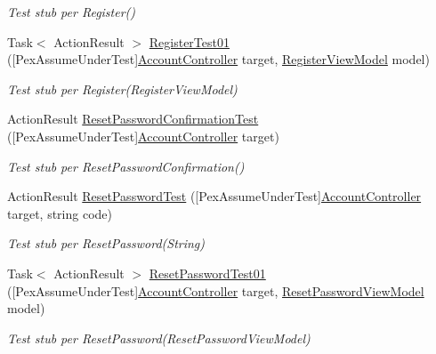 \begin{DoxyCompactItemize}
\begin{DoxyCompactList}\small\item\em Test stub per Register()\end{DoxyCompactList}\item 
Task$<$ Action\+Result $>$ \mbox{\hyperlink{class_brew_day2_1_1_controllers_1_1_testsn_1_1_account_controller_test_a70d7bb44301035e04a265cd34fd7b400}{Register\+Test01}} (\mbox{[}Pex\+Assume\+Under\+Test\mbox{]}\mbox{\hyperlink{class_brew_day2_1_1_controllers_1_1_account_controller}{Account\+Controller}} target, \mbox{\hyperlink{class_brew_day2_1_1_models_1_1_register_view_model}{Register\+View\+Model}} model)
\begin{DoxyCompactList}\small\item\em Test stub per Register(\+Register\+View\+Model)\end{DoxyCompactList}\item 
Action\+Result \mbox{\hyperlink{class_brew_day2_1_1_controllers_1_1_testsn_1_1_account_controller_test_a6ac01fc400a454f7f4038a81fed7ee5c}{Reset\+Password\+Confirmation\+Test}} (\mbox{[}Pex\+Assume\+Under\+Test\mbox{]}\mbox{\hyperlink{class_brew_day2_1_1_controllers_1_1_account_controller}{Account\+Controller}} target)
\begin{DoxyCompactList}\small\item\em Test stub per Reset\+Password\+Confirmation()\end{DoxyCompactList}\item 
Action\+Result \mbox{\hyperlink{class_brew_day2_1_1_controllers_1_1_testsn_1_1_account_controller_test_a40ec01e18af8d68e5dfa9a090d03a954}{Reset\+Password\+Test}} (\mbox{[}Pex\+Assume\+Under\+Test\mbox{]}\mbox{\hyperlink{class_brew_day2_1_1_controllers_1_1_account_controller}{Account\+Controller}} target, string code)
\begin{DoxyCompactList}\small\item\em Test stub per Reset\+Password(\+String)\end{DoxyCompactList}\item 
Task$<$ Action\+Result $>$ \mbox{\hyperlink{class_brew_day2_1_1_controllers_1_1_testsn_1_1_account_controller_test_a79d28e0747aa48923435fe021b74ad7c}{Reset\+Password\+Test01}} (\mbox{[}Pex\+Assume\+Under\+Test\mbox{]}\mbox{\hyperlink{class_brew_day2_1_1_controllers_1_1_account_controller}{Account\+Controller}} target, \mbox{\hyperlink{class_brew_day2_1_1_models_1_1_reset_password_view_model}{Reset\+Password\+View\+Model}} model)
\begin{DoxyCompactList}\small\item\em Test stub per Reset\+Password(\+Reset\+Password\+View\+Model)\end{DoxyCompactList}\item 

\end{DoxyCompactItemize}
